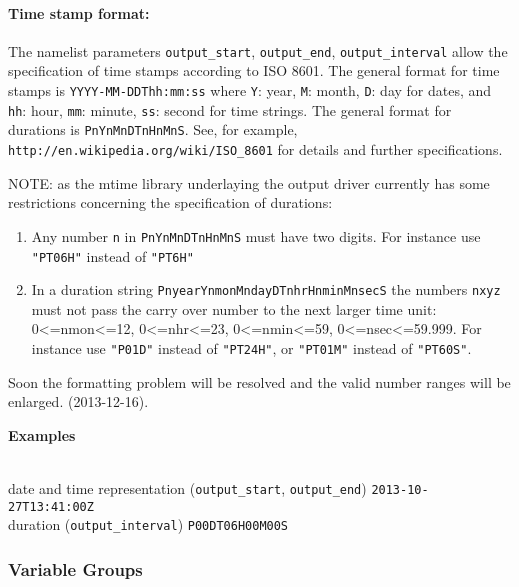 \paragraph{Time stamp format:}

The namelist parameters \texttt{output\_start}, \texttt{output\_end}, \texttt{output\_interval} allow
the specification of time stamps according to ISO 8601.
The general format for time stamps is \texttt{YYYY-MM-DDThh:mm:ss}
where \texttt{Y}: year, \texttt{M}: month, \texttt{D}: day for dates, 
and   \texttt{hh}: hour, \texttt{mm}: minute, \texttt{ss}: second for time strings.  
The general format for durations is \texttt{PnYnMnDTnHnMnS}.
See, for example, \texttt{http://en.wikipedia.org/wiki/ISO\_8601} for details and further specifications.

\color{red}NOTE: as the mtime library underlaying the output driver
  currently has some restrictions concerning the specification of durations:\begin{enumerate}
\item Any number \texttt{n} in \texttt{PnYnMnDTnHnMnS} must have two digits. For instance use \texttt{"PT06H"} instead of \texttt{"PT6H"}
\item In a duration string \texttt{PnyearYnmonMndayDTnhrHnminMnsecS} the numbers \texttt{nxyz} must not pass the carry over number to the next larger time unit: 0<=nmon<=12, 0<=nhr<=23, 0<=nmin<=59, 0<=nsec<=59.999. For instance use \texttt{"P01D"} instead of \texttt{"PT24H"}, or \texttt{"PT01M"} instead of \texttt{"PT60S"}.
\end{enumerate}

Soon the formatting problem will be resolved and the valid number ranges will be enlarged.
(2013-12-16).\color{black}

\begin{tabbing}
  \parbox{0.7\textwidth}{\textbf{Examples}} \= \\
  date and time representation (\texttt{output\_start}, \texttt{output\_end}) \>
  \texttt{2013-10-27T13:41:00Z} \\
  duration (\texttt{output\_interval}) \>
  \texttt{P00DT06H00M00S} \\
\end{tabbing}



\subsubsection*{Variable Groups}
